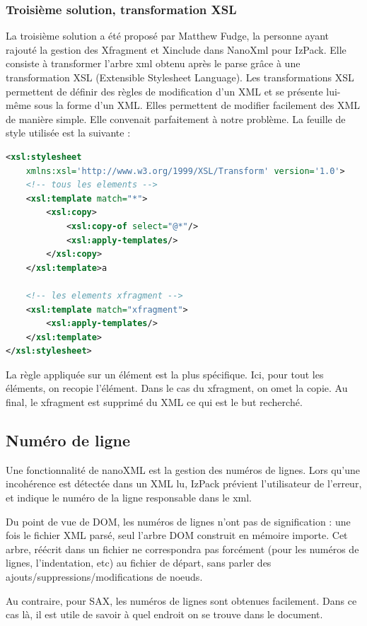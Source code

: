 \subsubsection{Troisième solution, transformation XSL}
La troisième solution a été proposé par Matthew Fudge, la personne ayant rajouté la gestion des Xfragment et Xinclude dans NanoXml pour IzPack.
Elle consiste à transformer l'arbre xml obtenu après le parse grâce à une transformation XSL (Extensible Stylesheet Language).
Les transformations XSL permettent de définir des règles de modification d'un XML et se présente lui-même sous la forme d'un XML.
Elles permettent de modifier facilement des XML de manière simple.
Elle convenait parfaitement à notre problème.
La feuille de style utilisée est la suivante :
\begin{lstlisting}[language=xml]
<xsl:stylesheet 
	xmlns:xsl='http://www.w3.org/1999/XSL/Transform' version='1.0'>
    <!-- tous les elements -->
    <xsl:template match="*">
        <xsl:copy>
            <xsl:copy-of select="@*"/>
            <xsl:apply-templates/>
        </xsl:copy>
    </xsl:template>a

    <!-- les elements xfragment -->
    <xsl:template match="xfragment">
        <xsl:apply-templates/>
    </xsl:template>
</xsl:stylesheet>
\end{lstlisting}

La règle appliquée sur un élément est la plus spécifique.
Ici, pour tout les éléments, on recopie l'élément.
Dans le cas du xfragment, on omet la copie.
Au final, le xfragment est supprimé du XML ce qui est le but recherché.
\subsection{Numéro de ligne}
Une fonctionnalité de nanoXML est la gestion des numéros de lignes.
Lors qu'une incohérence est détectée dans un XML lu, IzPack prévient l'utilisateur de l'erreur, et indique le numéro de la ligne responsable dans le xml.

Du point de vue de DOM, les numéros de lignes n'ont pas de signification : une fois le fichier XML parsé, seul l'arbre DOM construit en mémoire importe.
Cet arbre, réécrit dans un fichier ne correspondra pas forcément (pour les numéros de lignes, l'indentation, etc) au fichier de départ, sans parler des ajouts/suppressions/modifications de noeuds.

Au contraire, pour SAX, les numéros de lignes sont obtenues facilement.
Dans ce cas là, il est utile de savoir à quel endroit on se trouve dans le document.

